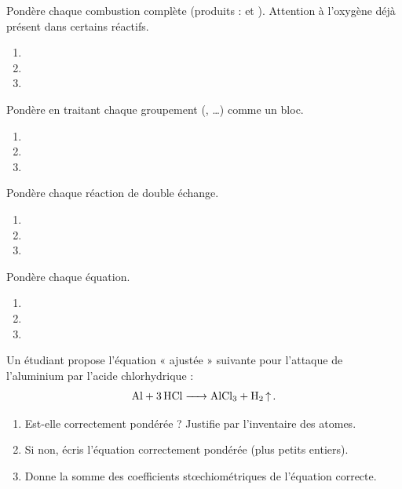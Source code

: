 \documentclass[11pt,a4paper]{article}
\begin{document}
\begin{exo}
Pondère chaque combustion complète (produits :  et ). Attention à l'oxygène déjà
présent dans certains réactifs.
\begin{enumerate}[label=\alph*)]
  \item {}
  \item {}
  \item {}
\end{enumerate}
\end{exo}

\begin{exo}
Pondère en traitant chaque groupement (, \ldots) comme un bloc.
\begin{enumerate}[label=\alph*)]
  \item {}
  \item {}
  \item {}
\end{enumerate}
\end{exo}

\begin{exo}
Pondère chaque réaction de double échange.
\begin{enumerate}[label=\alph*)]
  \item {}
  \item {}
  \item {}
\end{enumerate}
\end{exo}

\begin{exo}
Pondère chaque équation.
\begin{enumerate}[label=\alph*)]
  \item {}
  \item {}
  \item {}
\end{enumerate}
\end{exo}

\begin{exo}
Un étudiant propose l'équation « ajustée » suivante pour l'attaque de l'aluminium par l'acide
chlorhydrique :
\[
\ce{Al + 3 HCl -> AlCl3 + H2 ^}.
\]
\begin{enumerate}[label=\alph*)]
  \item Est-elle correctement pondérée ? Justifie par l'inventaire des atomes.
  \item Si non, écris l'équation correctement pondérée (plus petits entiers).
  \item Donne la somme des coefficients stœchiométriques de l'équation correcte.
\end{enumerate}
\end{exo}
\end{document}
